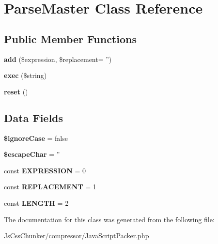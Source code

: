 \hypertarget{class_parse_master}{
\section{ParseMaster Class Reference}
\label{class_parse_master}
}
\subsection*{Public Member Functions}
\begin{DoxyCompactItemize}
\item 
\hypertarget{class_parse_master_a0c71c7fbac9c7e31d635f40272a5bcdb}{
{\bfseries add} (\$expression, \$replacement= '')}
\label{class_parse_master_a0c71c7fbac9c7e31d635f40272a5bcdb}

\item 
\hypertarget{class_parse_master_a87b0d2c16239ece5b03b0369a3a21ae0}{
{\bfseries exec} (\$string)}
\label{class_parse_master_a87b0d2c16239ece5b03b0369a3a21ae0}

\item 
\hypertarget{class_parse_master_a4a20559544fdf4dcb457e258dc976cf8}{
{\bfseries reset} ()}
\label{class_parse_master_a4a20559544fdf4dcb457e258dc976cf8}

\end{DoxyCompactItemize}
\subsection*{Data Fields}
\begin{DoxyCompactItemize}
\item 
\hypertarget{class_parse_master_a76b26ca72faf8384c4f8e767390feee9}{
{\bfseries \$ignoreCase} = false}
\label{class_parse_master_a76b26ca72faf8384c4f8e767390feee9}

\item 
\hypertarget{class_parse_master_a576a6e5a5b43ade4241337d002c561e9}{
{\bfseries \$escapeChar} = ''}
\label{class_parse_master_a576a6e5a5b43ade4241337d002c561e9}

\item 
\hypertarget{class_parse_master_a8118345ce2548c0b7d5d4f4627377170}{
const {\bfseries EXPRESSION} = 0}
\label{class_parse_master_a8118345ce2548c0b7d5d4f4627377170}

\item 
\hypertarget{class_parse_master_af38c88499c2aa3cea64112d5a5049b84}{
const {\bfseries REPLACEMENT} = 1}
\label{class_parse_master_af38c88499c2aa3cea64112d5a5049b84}

\item 
\hypertarget{class_parse_master_a82b2a4fda394ab955fce232ed2c7fd9d}{
const {\bfseries LENGTH} = 2}
\label{class_parse_master_a82b2a4fda394ab955fce232ed2c7fd9d}

\end{DoxyCompactItemize}


The documentation for this class was generated from the following file:\begin{DoxyCompactItemize}
\item 
JsCssChunker/compressor/JavaScriptPacker.php\end{DoxyCompactItemize}
